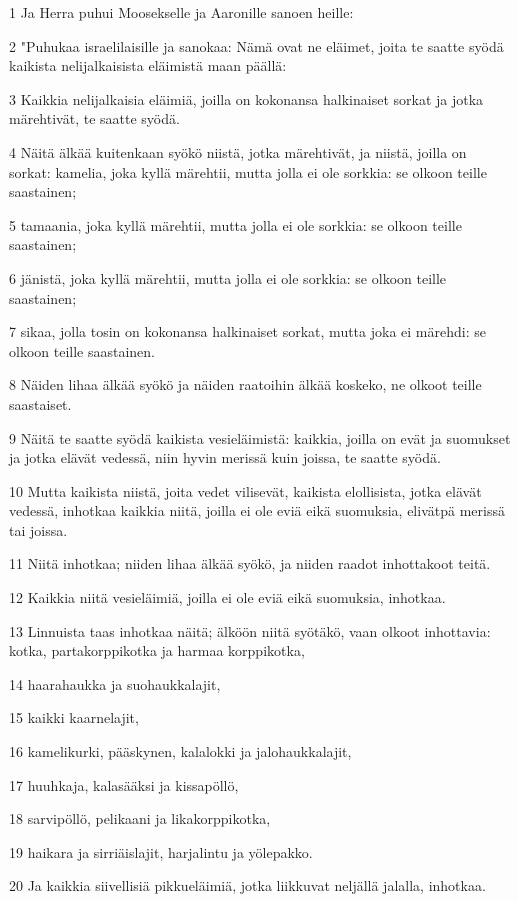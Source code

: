 \par 1 Ja Herra puhui Moosekselle ja Aaronille sanoen heille:
\par 2 "Puhukaa israelilaisille ja sanokaa: Nämä ovat ne eläimet, joita te saatte syödä kaikista nelijalkaisista eläimistä maan päällä:
\par 3 Kaikkia nelijalkaisia eläimiä, joilla on kokonansa halkinaiset sorkat ja jotka märehtivät, te saatte syödä.
\par 4 Näitä älkää kuitenkaan syökö niistä, jotka märehtivät, ja niistä, joilla on sorkat: kamelia, joka kyllä märehtii, mutta jolla ei ole sorkkia: se olkoon teille saastainen;
\par 5 tamaania, joka kyllä märehtii, mutta jolla ei ole sorkkia: se olkoon teille saastainen;
\par 6 jänistä, joka kyllä märehtii, mutta jolla ei ole sorkkia: se olkoon teille saastainen;
\par 7 sikaa, jolla tosin on kokonansa halkinaiset sorkat, mutta joka ei märehdi: se olkoon teille saastainen.
\par 8 Näiden lihaa älkää syökö ja näiden raatoihin älkää koskeko, ne olkoot teille saastaiset.
\par 9 Näitä te saatte syödä kaikista vesieläimistä: kaikkia, joilla on evät ja suomukset ja jotka elävät vedessä, niin hyvin merissä kuin joissa, te saatte syödä.
\par 10 Mutta kaikista niistä, joita vedet vilisevät, kaikista elollisista, jotka elävät vedessä, inhotkaa kaikkia niitä, joilla ei ole eviä eikä suomuksia, elivätpä merissä tai joissa.
\par 11 Niitä inhotkaa; niiden lihaa älkää syökö, ja niiden raadot inhottakoot teitä.
\par 12 Kaikkia niitä vesieläimiä, joilla ei ole eviä eikä suomuksia, inhotkaa.
\par 13 Linnuista taas inhotkaa näitä; älköön niitä syötäkö, vaan olkoot inhottavia: kotka, partakorppikotka ja harmaa korppikotka,
\par 14 haarahaukka ja suohaukkalajit,
\par 15 kaikki kaarnelajit,
\par 16 kamelikurki, pääskynen, kalalokki ja jalohaukkalajit,
\par 17 huuhkaja, kalasääksi ja kissapöllö,
\par 18 sarvipöllö, pelikaani ja likakorppikotka,
\par 19 haikara ja sirriäislajit, harjalintu ja yölepakko.
\par 20 Ja kaikkia siivellisiä pikkueläimiä, jotka liikkuvat neljällä jalalla, inhotkaa.
